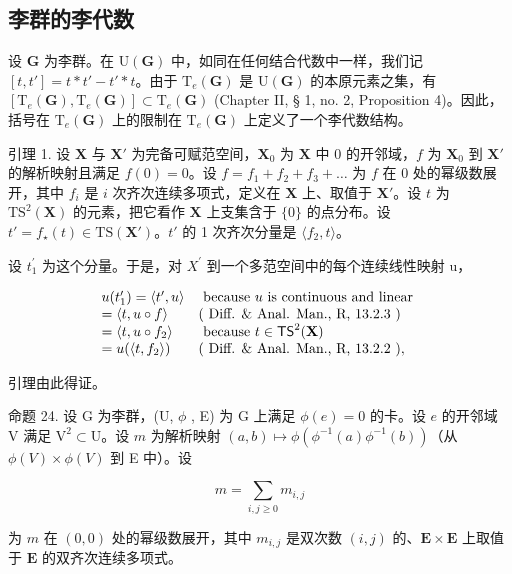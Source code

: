\subsection{李群的李代数}

设 \(\mathbf{G}\) 为李群。在 \(\mathrm{U}(\mathbf{G})\) 中，如同在任何结合代数中一样，我们记 \([t, t'] = t * t' - t' * t\)。由于 \(\mathrm{T}_{e}(\mathbf{G})\) 是 \(\mathrm{U}(\mathbf{G})\) 的本原元素之集，有 \([\mathrm{T}_{e}(\mathbf{G}), \mathrm{T}_{e}(\mathbf{G})] \subset \mathrm{T}_{e}(\mathbf{G})\) (Chapter II, § 1, no. 2, Proposition 4)。因此，括号在 \(\mathrm{T}_{e}(\mathbf{G})\) 上的限制在 \(\mathrm{T}_{e}(\mathbf{G})\) 上定义了一个李代数结构。

引理 1. 设 \(\mathbf{X}\) 与 \(\mathbf{X}'\) 为完备可赋范空间，\(\mathbf{X}_0\) 为 \(\mathbf{X}\) 中 0 的开邻域，\(f\) 为 \(\mathbf{X}_0\) 到 \(\mathbf{X}'\) 的解析映射且满足 \(f(0) = 0\)。设 \(f = f_1 + f_2 + f_3 + \dots\) 为 \(f\) 在 0 处的幂级数展开，其中 \(f_i\) 是 \(i\) 次齐次连续多项式，定义在 \(\mathbf{X}\) 上、取值于 \(\mathbf{X}'\)。设 \(t\) 为 \(\mathrm{TS}^2 (\mathbf{X})\) 的元素，把它看作 \(\mathbf{X}\) 上支集含于 \(\{0\}\) 的点分布。设 \(t' = f_{\star}(t) \in \mathrm{TS}(\mathbf{X}')\)。\(t'\) 的 1 次齐次分量是 \(\langle f_2, t \rangle\)。

设 \(t_{1}^{\prime}\) 为这个分量。于是，对 \(X^{\prime}\) 到一个多范空间中的每个连续线性映射 u，

\[
\begin{array}{l l} u (t _ {1} ^ {\prime}) = \langle t ^ {\prime}, u \rangle & \text { because   } u \text {   is   continuous   and   linear } \\ = \langle t, u \circ f \rangle & (\text { Diff.   \&   Anal.   Man.,   R,   13.2.3 }) \\ = \langle t, u \circ f _ {2} \rangle & \text { because   } t \in \mathsf {T S} ^ {2} (\mathbf {X}) \\ = u (\langle t, f _ {2} \rangle) & (\text { Diff.   \&   Anal.   Man.,   R,   13.2.2 }), \end{array}
\]

引理由此得证。

命题 24. 设 G 为李群，(U, \(\phi\) , E) 为 G 上满足 \(\phi(e) = 0\) 的卡。设 \(e\) 的开邻域 V 满足 \(\mathrm{V}^2 \subset \mathrm{U}\)。设 \(m\) 为解析映射 \((a, b) \mapsto \phi(\phi^{-1}(a)\phi^{-1}(b))\)（从 \(\phi(V) \times \phi(V)\) 到 E 中）。设

\[
m = \sum_ {i, j \geqslant 0} m _ {i, j}
\]

为 \(m\) 在 \((0,0)\) 处的幂级数展开，其中 \(m_{i,j}\) 是双次数 \((i,j)\) 的、\(\mathbf{E} \times \mathbf{E}\) 上取值于 \(\mathbf{E}\) 的双齐次连续多项式。

